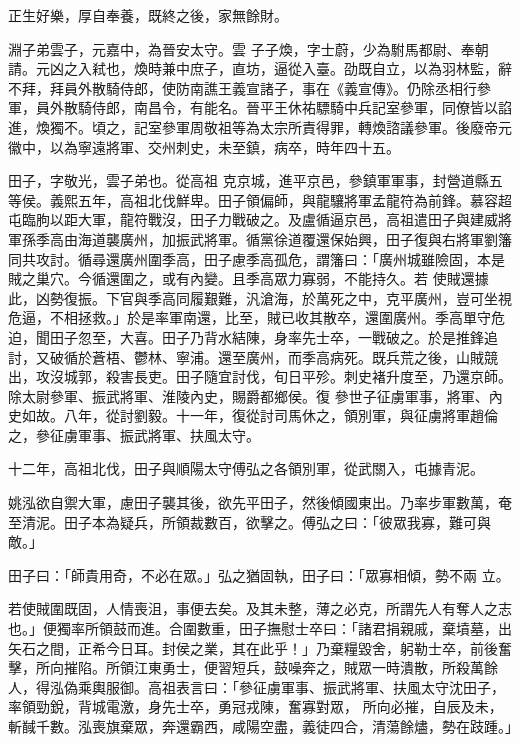 \begin{pinyinscope}
 正生好樂，厚自奉養，既終之後，家無餘財。



 淵子弟雲子，元嘉中，為晉安太守。雲
 子子煥，字士蔚，少為駙馬都尉、奉朝請。元凶之入弒也，煥時兼中庶子，直坊，逼從入臺。劭既自立，以為羽林監，辭不拜，拜員外散騎侍郎，使防南譙王義宣諸子，事在《義宣傳》。仍除丞相行參軍，員外散騎侍郎，南昌令，有能名。晉平王休祐驃騎中兵記室參軍，同僚皆以諂進，煥獨不。頃之，記室參軍周敬祖等為太宗所責得罪，轉煥諮議參軍。後廢帝元徽中，以為寧遠將軍、交州刺史，未至鎮，病卒，時年四十五。



 田子，字敬光，雲子弟也。從高祖
 克京城，進平京邑，參鎮軍軍事，封營道縣五等侯。義熙五年，高祖北伐鮮卑。田子領偏師，與龍驤將軍孟龍符為前鋒。慕容超屯臨朐以距大軍，龍符戰沒，田子力戰破之。及盧循逼京邑，高祖遣田子與建威將軍孫季高由海道襲廣州，加振武將軍。循黨徐道覆還保始興，田子復與右將軍劉籓同共攻討。循尋還廣州圍季高，田子慮季高孤危，謂籓曰：「廣州城雖險固，本是賊之巢穴。今循還圍之，或有內變。且季高眾力寡弱，不能持久。若
 使賊還據此，凶勢復振。下官與季高同履艱難，汎滄海，於萬死之中，克平廣州，豈可坐視危逼，不相拯救。」於是率軍南還，比至，賊已收其散卒，還圍廣州。季高單守危迫，聞田子忽至，大喜。田子乃背水結陳，身率先士卒，一戰破之。於是推鋒追討，又破循於蒼梧、鬱林、寧浦。還至廣州，而季高病死。既兵荒之後，山賊競出，攻沒城郭，殺害長吏。田子隨宜討伐，旬日平殄。刺史褚升度至，乃還京師。除太尉參軍、振武將軍、淮陵內史，賜爵都鄉侯。復
 參世子征虜軍事，將軍、內史如故。八年，從討劉毅。十一年，復從討司馬休之，領別軍，與征虜將軍趙倫之，參征虜軍事、振武將軍、扶風太守。



 十二年，高祖北伐，田子與順陽太守傅弘之各領別軍，從武關入，屯據青泥。



 姚泓欲自禦大軍，慮田子襲其後，欲先平田子，然後傾國東出。乃率步軍數萬，奄至清泥。田子本為疑兵，所領裁數百，欲擊之。傅弘之曰：「彼眾我寡，難可與敵。」



 田子曰：「師貴用奇，不必在眾。」弘之猶固執，田子曰：「眾寡相傾，勢不兩
 立。



 若使賊圍既固，人情喪沮，事便去矣。及其未整，薄之必克，所謂先人有奪人之志也。」便獨率所領鼓而進。合圍數重，田子撫慰士卒曰：「諸君捐親戚，棄墳墓，出矢石之間，正希今日耳。封侯之業，其在此乎！」乃棄糧毀舍，躬勒士卒，前後奮擊，所向摧陷。所領江東勇士，便習短兵，鼓噪奔之，賊眾一時潰散，所殺萬餘人，得泓偽乘輿服御。高祖表言曰：「參征虜軍事、振武將軍、扶風太守沈田子，率領勁銳，背城電激，身先士卒，勇冠戎陳，奮寡對眾，
 所向必摧，自辰及未，斬馘千數。泓喪旗棄眾，奔還霸西，咸陽空盡，義徒四合，清蕩餘燼，勢在跂踵。」




\end{pinyinscope}

